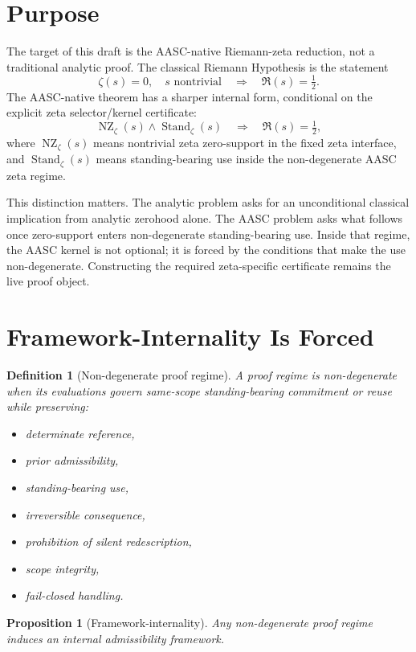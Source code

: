 \documentclass[11pt]{article}
\newtheorem{proposition}{Proposition}
\newtheorem{definition}{Definition}
\newcommand{\Half}{\tfrac12}
\newcommand{\Stand}{\operatorname{Stand}}
\newcommand{\NZ}{\operatorname{NZ}}
\begin{document}
\section{Purpose}

The target of this draft is the AASC-native Riemann-zeta reduction, not a
traditional analytic proof.  The classical Riemann Hypothesis is the statement
\[
  \zeta(s)=0,\quad s \text{ nontrivial}
  \quad\Longrightarrow\quad
  \Re(s)=\Half.
\]
The AASC-native theorem has a sharper internal form, conditional on the
explicit zeta selector/kernel certificate:
\[
  \NZ_{\zeta}(s) \wedge \Stand_{\zeta}(s)
  \quad\Longrightarrow\quad
  \Re(s)=\Half,
\]
where \(\NZ_{\zeta}(s)\) means nontrivial zeta zero-support in the fixed zeta
interface, and \(\Stand_{\zeta}(s)\) means standing-bearing use inside the
non-degenerate AASC zeta regime.

This distinction matters.  The analytic problem asks for an unconditional
classical implication from analytic zerohood alone.  The AASC problem asks
what follows once zero-support enters non-degenerate standing-bearing use.
Inside that regime, the AASC kernel is not optional; it is forced by the
conditions that make the use non-degenerate.  Constructing the required
zeta-specific certificate remains the live proof object.

\section{Framework-Internality Is Forced}

\begin{definition}[Non-degenerate proof regime]
A proof regime is non-degenerate when its evaluations govern same-scope
standing-bearing commitment or reuse while preserving:
\begin{itemize}
  \item determinate reference,
  \item prior admissibility,
  \item standing-bearing use,
  \item irreversible consequence,
  \item prohibition of silent redescription,
  \item scope integrity,
  \item fail-closed handling.
\end{itemize}
\end{definition}

\begin{proposition}[Framework-internality]
Any non-degenerate proof regime induces an internal admissibility framework.
\end{proposition}
\end{document}
